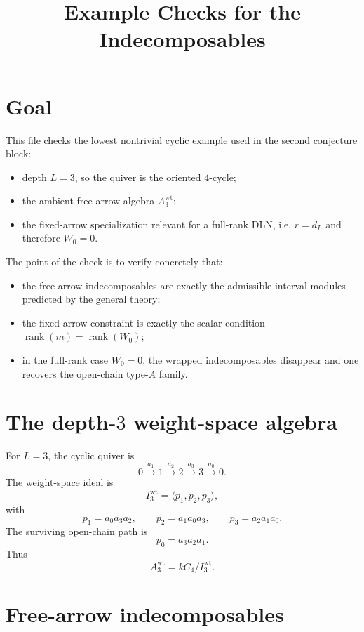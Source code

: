 \documentclass{article}
\title{Example Checks for the Indecomposables}
\date{}
\newcommand{\rk}{\operatorname{rank}}
\theoremstyle{definition}
\begin{document}
\maketitle

\section{Goal}

This file checks the lowest nontrivial cyclic example used in the second
conjecture block:

\begin{itemize}
\item depth $L=3$, so the quiver is the oriented $4$-cycle;
\item the ambient free-arrow algebra $A_3^{\mathrm{wt}}$;
\item the fixed-arrow specialization relevant for a full-rank DLN, i.e.
  $r=d_L$ and therefore $W_0=0$.
\end{itemize}

The point of the check is to verify concretely that:

\begin{itemize}
\item the free-arrow indecomposables are exactly the admissible interval modules
  predicted by the general theory;
\item the fixed-arrow constraint is exactly the scalar condition
  $\rk(m)=\rk(W_0)$;
\item in the full-rank case $W_0=0$, the wrapped indecomposables disappear and
  one recovers the open-chain type-$A$ family.
\end{itemize}

\section{The depth-$3$ weight-space algebra}

For $L=3$, the cyclic quiver is
\[
0 \xrightarrow{a_1} 1 \xrightarrow{a_2} 2 \xrightarrow{a_3} 3 \xrightarrow{a_0} 0.
\]
The weight-space ideal is
\[
I_3^{\mathrm{wt}}
=
\langle p_1,p_2,p_3\rangle,
\]
with
\[
p_1=a_0a_3a_2,
\qquad
p_2=a_1a_0a_3,
\qquad
p_3=a_2a_1a_0.
\]
The surviving open-chain path is
\[
p_0=a_3a_2a_1.
\]
Thus
\[
A_3^{\mathrm{wt}}=kC_4/I_3^{\mathrm{wt}}.
\]

\section{Free-arrow indecomposables}
\end{document}
